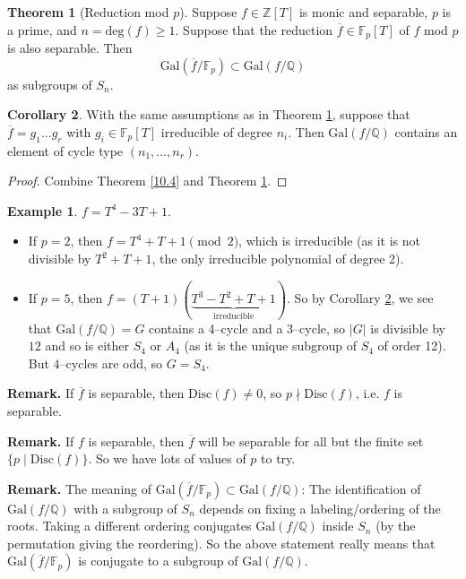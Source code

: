 \documentclass{article}
\theoremstyle{definition}
\newtheorem{theorem}{Theorem}[section]
\newtheorem{cor}[theorem]{Corollary}
\newtheorem{example}{Example}[section]
\begin{document}
\begin{theorem}[Reduction mod $p$]\label{10.5}
    Suppose $f \in \mathbb{Z}[T]$ is monic and separable, $p$ is a prime, and $n = \text{deg}(f)\ge 1$. Suppose that the reduction $\overline{f} \in \mathbb{F}_p[T]$ of $f$ mod $p$ is also separable. Then
    \[
    \text{Gal}(\overline{f}/\mathbb{F}_p) \subset \text{Gal}(f/\mathbb{Q})
    \]
    as subgroups of $S_n$.
\end{theorem}
\begin{cor}\label{10.6}
    With the same assumptions as in Theorem \ref{10.5}, suppose that $\overline{f}=g_1\ldots g_r$ with $g_i \in \mathbb{F}_p[T]$ irreducible of degree $n_i$. Then $\text{Gal}(f/\mathbb{Q})$ contains an element of cycle type $(n_1,\ldots,n_r)$.
\end{cor}
\begin{proof}
    Combine Theorem \ref{10.4} and Theorem \ref{10.5}.
\end{proof}
\begin{example}
    $f = T^4 - 3T + 1$.
    \begin{itemize}
        \item If $p=2$, then $f = T^4+T+1 \pmod{2}$, which is irreducible (as it is not divisible by $T^2+T+1$, the only irreducible polynomial of degree 2).
        \item If $p=5$, then $f=(T+1)(\underbrace{T^3-T^2+T+1}_{\text{irreducible}})$. So by Corollary \ref{10.6}, we see that $\text{Gal}(f/\mathbb{Q})=G$ contains a 4--cycle and a 3--cycle, so $|G|$ is divisible by $12$ and so is either $S_4$ or $A_4$ (as it is the unique subgroup of $S_4$ of order 12). But $4$--cycles are odd, so $G = S_4$.
    \end{itemize}
\end{example}
\textbf{Remark.} If $\overline{f}$ is separable, then $\text{Disc}(f) \neq 0$, so $p \nmid \text{Disc}(f)$, i.e. $f$ is separable.

\textbf{Remark.} If $f$ is separable, then $\overline{f}$ will be separable for all but the finite set $\{p \mid \text{Disc}(f)\}$. So we have lots of values of $p$ to try.

\textbf{Remark.} The meaning of $\text{Gal}(\overline{f}/\mathbb{F}_p) \subset \text{Gal}(f/\mathbb{Q})$: The identification of $\text{Gal}(f/\mathbb{Q})$ with a subgroup of $S_n$ depends on fixing a labeling/ordering of the roots. Taking a different ordering conjugates $\text{Gal}(f/\mathbb{Q})$ inside $S_n$ (by the permutation giving the reordering). So the above statement really means that $\text{Gal}(\overline{f}/\mathbb{F}_p)$ is conjugate to a subgroup of $\text{Gal}(f/\mathbb{Q})$.
\vspace{1mm}
\end{document}
